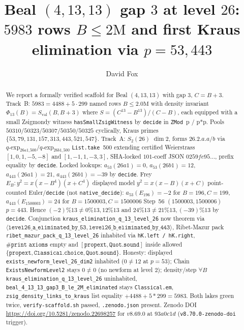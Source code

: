 \documentclass[12pt]{amsart}
\title{Beal $(4,13,13)$ gap $3$ at level $26$: $5983$ rows $B\le 2\text{M}$ and first Kraus elimination via $p=53,443$}
\author{David Fox}
\begin{document}
\maketitle

\begin{abstract}
We report a formally verified scaffold for Beal $(4,13,13)$ with gap $3$, $C=B+3$.
Track~B: $5983=4488+5\cdot 299$ named rows $B\le 2.0\text{M}$ with density invariant
$\Phi_{13}(B)=S_{\mathrm{val}}(B,B+3)$ where $S=(C^{13}-B^{13})/(C-B)$,
each equipped with a small Zsigmondy witness \texttt{hasSmallZsigWitness} by
\texttt{decide} in \texttt{ZMod }p / p*p.
Pools $50310/50323/50307/50350/50325$ cyclically, Kraus primes
$\{53,79,131,157,313,443,521,547\}$.
Track~A: $S_2(26)$ $\dim 2$, forms $26.2.a.a/b$ via $q\text{-exp}_{26a1\_500}/q\text{-exp}_{26b1\_500}$
\texttt{List.take }500 extending certified Weierstrass
$[1,0,1,-5,-8]$ and $[1,-1,1,-3,3]$, SHA-locked $101$-coeff JSON $0259fe95\ldots$,
prefix equality by \texttt{decide}.
Locked lookups: $a_{53}(26a1)=0$, $a_{53}(26b1)=12$, $a_{443}(26a1)=21$,
$a_{443}(26b1)=-39$ by \texttt{decide}.
Frey $E_B: y^2=x(x-B^4)(x+C^4)$ displayed model $y^2=x(x-B)(x+C)$ point-counted
Euler/\texttt{decide} (not \texttt{native\_decide}):
$a_{53}(E_{196})=-2$ for $B=196,C=199$,
$a_{443}(E_{1500003})=24$ for $B=1500003,C=1500006$ Step~56 $(1500003,1500006)$ $p=443$.
Hence $(-2)\%13\neq 0\%13,12\%13$ and $24\%13\neq 21\%13,(-39)\%13$ by \texttt{decide}.
Conjunction \texttt{kraus\_elimination\_q\_13\_level\_26} now theorem via
$\langle\texttt{level26\_a\_eliminated\_by\_53},\texttt{level26\_b\_eliminated\_by\_443}\rangle$,
Ribet-Mazur pack \texttt{ribet\_mazur\_pack\_q\_13\_level\_26} inhabited via
\texttt{hK.left / hK.right}, $\#\texttt{print axioms}$ empty and
$[\texttt{propext},\texttt{Quot.sound}]$ inside allowed
$\{\texttt{propext},\texttt{Classical.choice},\texttt{Quot.sound}\}$.
Honesty: displayed \texttt{exists\_newform\_level\_26\_dim2} inhabited
($0\neq12$ at $p=53$); Chain \texttt{ExistsNewformLevel2} stays $0\neq0$
(no newform at level $2$); density/step
$\forall B$ \texttt{kraus\_elimination\_q\_13\_level\_26} uninhabited,
\texttt{beal\_4\_13\_13\_gap3\_B\_le\_2M\_eliminated} stays \texttt{Classical.em},
\texttt{zsig\_density\_links\_to\_kraus} list equality $+4488+5*299=5983$.
Both lakes green twice, \texttt{verify-scaffold.sh} passed, \texttt{.zenodo.json}
present. Zenodo DOI \url{https://doi.org/10.5281/zenodo.22698257} for $v8.69.0$ at $93a0c1d$ (\texttt{v8.70.0-zenodo-doi} trigger).
\end{abstract}
\end{document}
